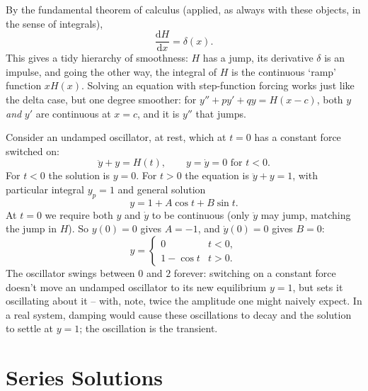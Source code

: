 \documentclass[a4paper]{scrartcl}
\begin{document}
\begin{center}
\end{center}

By the fundamental theorem of calculus (applied, as always with these objects, in the sense of integrals),
$$
\frac{\mathrm{d}H}{\mathrm{d}x} = \delta(x).
$$
This gives a tidy hierarchy of smoothness: $H$ has a jump, its derivative $\delta$ is an impulse, and going the other way, the integral of $H$ is the continuous `ramp' function $x H(x)$. Solving an equation with step-function forcing works just like the delta case, but one degree smoother: for $y'' + py' + qy = H(x - c)$, both $y$ \emph{and} $y'$ are continuous at $x = c$, and it is $y''$ that jumps.

\begin{example}
	Consider an undamped oscillator, at rest, which at $t = 0$ has a constant force switched on:
	$$
	\ddot y + y = H(t), \qquad y = \dot y = 0 \text{ for } t < 0.
	$$
	For $t < 0$ the solution is $y = 0$. For $t > 0$ the equation is $\ddot y + y = 1$, with particular integral $y_p = 1$ and general solution
	$$
	y = 1 + A \cos t + B \sin t.
	$$
	At $t = 0$ we require both $y$ and $\dot y$ to be continuous (only $\ddot y$ may jump, matching the jump in $H$). So $y(0) = 0$ gives $A = -1$, and $\dot y(0) = 0$ gives $B = 0$:
	$$
	y = \begin{cases} 0 & t < 0, \\ 1 - \cos t & t > 0. \end{cases}
	$$
	The oscillator swings between $0$ and $2$ forever: switching on a constant force doesn't move an undamped oscillator to its new equilibrium $y = 1$, but sets it oscillating about it -- with, note, twice the amplitude one might naively expect. In a real system, damping would cause these oscillations to decay and the solution to settle at $y = 1$; the oscillation is the transient.
\end{example}

\section{Series Solutions}
\end{document}

